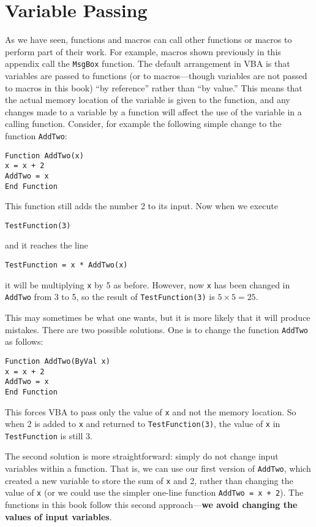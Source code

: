 {\section{Variable Passing}

As we have seen, functions and macros can call other functions or macros to perform part of their work.  For example, macros shown previously in this appendix call the \verb!MsgBox! function.  
The default arrangement in VBA is that variables are passed to functions (or to macros---though  variables are not passed to macros in this book) ``by reference'' rather than ``by value.''  This means that the actual memory location of the variable is given to the function, and any changes made to a variable by a function will affect the use of the variable in a calling function.  Consider, for example the following simple change to the function \verb!AddTwo!:
\small\begin{verbatim}
Function AddTwo(x)
x = x + 2
AddTwo = x
End Function
\end{verbatim}\normalsize
This function still adds the number 2 to its input.  Now when we execute 
\small\begin{verbatim}
TestFunction(3)
\end{verbatim}\normalsize and it reaches the line
\small\begin{verbatim}
TestFunction = x * AddTwo(x)
\end{verbatim}\normalsize
it will be multiplying \verb!x! by 5 as before.  However, now \verb!x! has been changed in \verb!AddTwo! from 3 to 5, so the result of \verb!TestFunction(3)! is $5 \times 5 = 25$.

This may sometimes be what one wants, but it is more likely that it will produce mistakes.  There are two possible solutions.  One is to change the function \verb!AddTwo! as follows:
\small\begin{verbatim}
Function AddTwo(ByVal x)
x = x + 2
AddTwo = x
End Function
\end{verbatim}\normalsize
This forces VBA to pass only the value of \verb!x! and not the memory location.  So when 2 is added to \verb!x! and returned to \verb!TestFunction(3)!, the value of \verb!x! in \verb!TestFunction! is still 3.

The second solution is more straightforward:  simply do not change input variables within a function.  That is, we can use our first version of \verb!AddTwo!, which created a new variable to store the sum of \verb!x! and 2, rather than changing the value of \verb!x! (or we could use the simpler one-line function \verb!AddTwo = x + 2!).  The functions in this book follow this second approach---\textbf{we avoid changing the values of input variables}.

}
